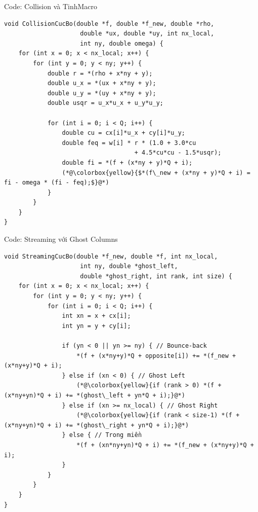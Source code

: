 \documentclass[t, aspectratio=169]{beamer}
\begin{document}
	\begin{frame}[fragile]{Code: Collision và TinhMacro}
		\begin{lstlisting}[caption={Hàm Collision - Toán tử BGK}]
void CollisionCucBo(double *f, double *f_new, double *rho, 
                     double *ux, double *uy, int nx_local, 
                     int ny, double omega) {
    for (int x = 0; x < nx_local; x++) {
        for (int y = 0; y < ny; y++) {
            double r = *(rho + x*ny + y);
            double u_x = *(ux + x*ny + y);
            double u_y = *(uy + x*ny + y);
            double usqr = u_x*u_x + u_y*u_y;
            
            for (int i = 0; i < Q; i++) {
                double cu = cx[i]*u_x + cy[i]*u_y;
                double feq = w[i] * r * (1.0 + 3.0*cu 
                                    + 4.5*cu*cu - 1.5*usqr);
                double fi = *(f + (x*ny + y)*Q + i);
                (*@\colorbox{yellow}{$*(f\_new + (x*ny + y)*Q + i) = fi - omega * (fi - feq);$}@*)
            }
        }
    }
}
		\end{lstlisting}
	\end{frame}
	
	\begin{frame}[fragile]{Code: Streaming với Ghost Columns}
		\begin{lstlisting}[caption={Hàm StreamingCucBo - Xử lý biên với Ghost}]
void StreamingCucBo(double *f_new, double *f, int nx_local, 
                     int ny, double *ghost_left, 
                     double *ghost_right, int rank, int size) {
    for (int x = 0; x < nx_local; x++) {
        for (int y = 0; y < ny; y++) {
            for (int i = 0; i < Q; i++) {
                int xn = x + cx[i]; 
                int yn = y + cy[i];
                
                if (yn < 0 || yn >= ny) { // Bounce-back
                    *(f + (x*ny+y)*Q + opposite[i]) += *(f_new + (x*ny+y)*Q + i);
                } else if (xn < 0) { // Ghost Left
                    (*@\colorbox{yellow}{if (rank > 0) *(f + (x*ny+yn)*Q + i) += *(ghost\_left + yn*Q + i);}@*)
                } else if (xn >= nx_local) { // Ghost Right
                    (*@\colorbox{yellow}{if (rank < size-1) *(f + (x*ny+yn)*Q + i) += *(ghost\_right + yn*Q + i);}@*)
                } else { // Trong miền
                    *(f + (xn*ny+yn)*Q + i) += *(f_new + (x*ny+y)*Q + i);
                }
            }
        }
    }
}
		\end{lstlisting}
	\end{frame}
	
\end{document}
